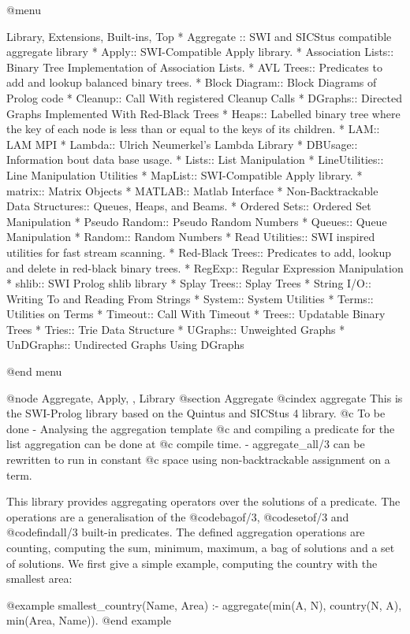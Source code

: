 {{{{{{{{@menu
 
Library, Extensions, Built-ins, Top
* Aggregate :: SWI and SICStus compatible aggregate library
* Apply:: SWI-Compatible Apply library.
* Association Lists:: Binary Tree Implementation of Association Lists.
* AVL Trees:: Predicates to add and lookup balanced binary  trees.
* Block Diagram:: Block Diagrams of Prolog code
* Cleanup:: Call With registered Cleanup Calls
* DGraphs:: Directed Graphs Implemented With Red-Black Trees
* Heaps:: Labelled binary tree where the key of each node is less
    than or equal to the keys of its children.
* LAM:: LAM MPI
* Lambda:: Ulrich Neumerkel's Lambda Library
* DBUsage:: Information bout data base usage.
* Lists:: List Manipulation
* LineUtilities:: Line Manipulation Utilities
* MapList:: SWI-Compatible Apply library.
* matrix:: Matrix Objects
* MATLAB:: Matlab Interface
* Non-Backtrackable Data Structures:: Queues, Heaps, and Beams.
* Ordered Sets:: Ordered Set Manipulation
* Pseudo Random:: Pseudo Random Numbers
* Queues:: Queue Manipulation
* Random:: Random Numbers
* Read Utilities:: SWI inspired utilities for fast stream scanning.
* Red-Black Trees:: Predicates to add, lookup and delete in red-black binary  trees.
* RegExp:: Regular Expression Manipulation
* shlib:: SWI Prolog shlib library
* Splay Trees:: Splay Trees
* String I/O:: Writing To and Reading From Strings
* System:: System Utilities
* Terms:: Utilities on Terms
* Timeout:: Call With Timeout
* Trees:: Updatable Binary Trees
* Tries:: Trie Data Structure
* UGraphs:: Unweighted Graphs
* UnDGraphs:: Undirected Graphs Using DGraphs


@end menu

 
@node Aggregate, Apply, , Library
@section Aggregate
@cindex aggregate
This is the SWI-Prolog library based on  the Quintus and SICStus 4
library.   @c To be done - Analysing the aggregation template
@c and compiling a predicate for the list aggregation can be done at
@c compile time.  - aggregate_all/3 can be rewritten to run in constant
@c space using non-backtrackable assignment on a term.

This library provides aggregating operators over the solutions of a
predicate. The operations are a generalisation of the @code{bagof/3},
@code{setof/3} and @code{findall/3} built-in predicates. The defined
aggregation operations are counting, computing the sum, minimum,
maximum, a bag of solutions and a set of solutions. We first give a
simple example, computing the country with the smallest area:

@example
smallest_country(Name, Area) :-
        aggregate(min(A, N), country(N, A), min(Area, Name)).
@end example

}}}}}}}}
